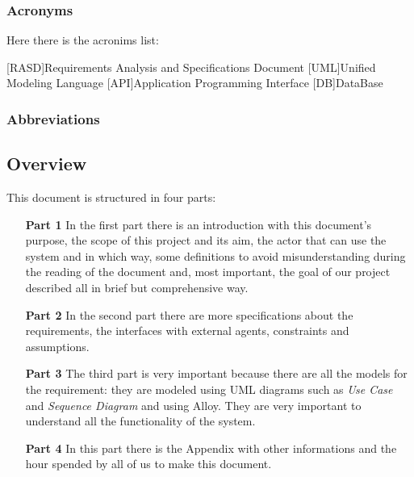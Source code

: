 \subsubsection{Acronyms} \label{acr}
Here there is the acronims list:

\begin{acronym}[RASD] %

[RASD]{Requirements Analysis and Specifications Document}
[UML]{Unified Modeling Language}
[API]{Application Programming Interface}
[DB]{DataBase}

\end{acronym}

\subsubsection{Abbreviations} \label{abbre}


\subsection{Overview} \label{subsec:overview}
This document is structured in four parts:
\begin{itemize}
\item[\textbf{Part 1}]In the first part there is an introduction with this document’s purpose, the scope of this project and its aim, the actor that can use  the system and in which way, some definitions to avoid misunderstanding during the reading of the document and, most important, the goal of our project described all in brief but comprehensive way.  
\item[\textbf{Part 2}]In the second part there are more specifications about the requirements, the interfaces with external agents, constraints and assumptions.
\item[\textbf{Part 3}]The third part is very important because there are all the models for the requirement: they are modeled using UML diagrams such as \emph{Use Case} and \emph{Sequence Diagram} and using Alloy. They are very important to understand all the functionality of the system.  
\item[\textbf{Part 4}]In this part there is the Appendix with other informations and the hour spended by all of us to make this document.
\end{itemize}

